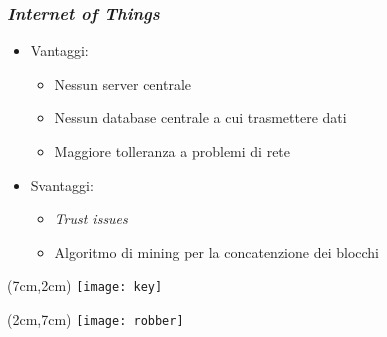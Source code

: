 \begin{frame}
 \frametitle{\textit{Internet of Things}}

 \begin{itemize}
  \item<1-> Vantaggi:
  \begin{itemize}
   \item Nessun server centrale
   \item Nessun database centrale a cui trasmettere dati
   \item Maggiore tolleranza a problemi di rete
  \end{itemize}

  \item<2-> Svantaggi:
  \begin{itemize}
   \item \textit{Trust issues}
   \item Algoritmo di mining per la concatenzione dei blocchi
  \end{itemize}

 \end{itemize}


 \begin{textblock*}{5cm}(7cm,2cm)
  \texttt{[image: key]}
 \end{textblock*}


 \begin{textblock*}{5cm}(2cm,7cm)
  \texttt{[image: robber]}
 \end{textblock*}

\end{frame}
